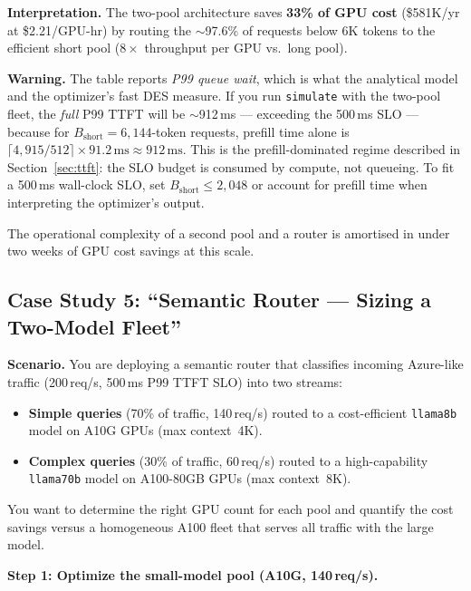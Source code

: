 \documentclass[11pt,a4paper]{article}
\newenvironment{warning}
  {\begin{mdframed}[backgroundcolor=orange!8!white,linecolor=orange!70!black,linewidth=1pt]
   \textbf{Warning. }\ignorespaces}
  {\end{mdframed}}
\newcommand{\Bshort}{B_{\text{short}}}
\begin{document}
\textbf{Interpretation.}  The two-pool architecture saves
\textbf{33\% of GPU cost} (\$581K/yr at \$2.21/GPU-hr) by routing
the $\sim$97.6\% of requests below 6K tokens to the efficient
short pool ($8\times$ throughput per GPU vs.\ long pool).

\begin{warning}
  The table reports \emph{P99 queue wait}, which is what the
  analytical model and the optimizer's fast DES measure.  If you
  run \texttt{simulate} with the two-pool fleet, the \emph{full}
  P99 TTFT will be $\sim$912\,ms --- exceeding the 500\,ms SLO ---
  because for $\Bshort = 6{,}144$-token requests, prefill time
  alone is $\lceil 4{,}915/512 \rceil \times 91.2\,\text{ms}
  \approx 912\,\text{ms}$.  This is the prefill-dominated regime
  described in Section~\ref{sec:ttft}: the SLO budget is consumed
  by compute, not queueing.  To fit a 500\,ms wall-clock SLO, set
  $\Bshort \leq 2{,}048$ or account for prefill time when
  interpreting the optimizer's output.
\end{warning}

The operational complexity of a second pool and a router is
amortised in under two weeks of GPU cost savings at this scale.

\subsection{Case Study 5: ``Semantic Router --- Sizing a Two-Model Fleet''}
\label{sec:cs-semantic}

\textbf{Scenario.}  You are deploying a semantic router that classifies
incoming Azure-like traffic (200\,req/s, 500\,ms P99 TTFT SLO) into two
streams:

\begin{itemize}[nosep]
  \item \textbf{Simple queries} (70\% of traffic, 140\,req/s) routed to a
    cost-efficient \texttt{llama8b} model on A10G GPUs (max context~4K).
  \item \textbf{Complex queries} (30\% of traffic, 60\,req/s) routed to a
    high-capability \texttt{llama70b} model on A100-80GB GPUs (max context~8K).
\end{itemize}

You want to determine the right GPU count for each pool and quantify the
cost savings versus a homogeneous A100 fleet that serves all traffic with
the large model.

\textbf{Step 1: Optimize the small-model pool (A10G, 140\,req/s).}
\end{document}
